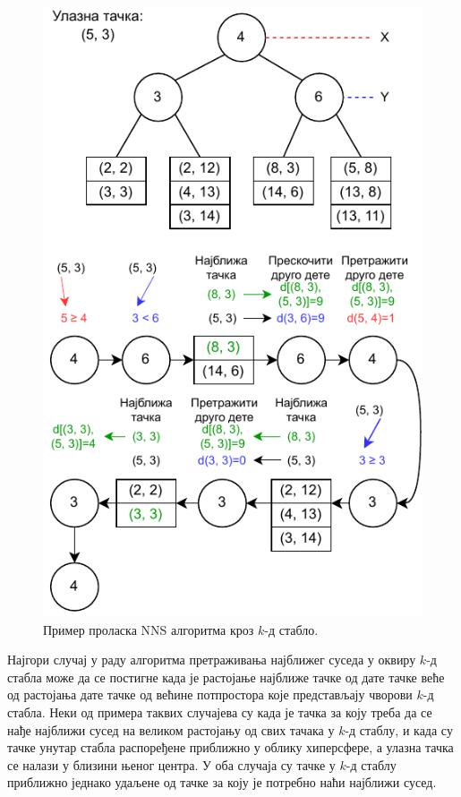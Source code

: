 \documentclass[master]{finthesis}
\newcommand*{\kd}{\texorpdfstring{$k$}{k}-д }
\begin{document}
\begin{figure}
    \centering
    \includegraphics[height=0.9\textheight]{slike/kd_traversal_sr.pdf}
    \caption{Пример проласка NNS алгоритма кроз \kd стабло.}
    \label{fig:kd-traversal}
\end{figure}

Најгори случај у раду алгоритма претраживања најближег суседа у оквиру \kd стабла може да се постигне када је растојање најближе тачке од дате тачке веће од растојања дате тачке од већине потпростора које представљају чворови \kd стабла. Неки од примера таквих случајева су када је тачка за коју треба да се нађе најближи сусед на великом растојању од свих тачака у \kd стаблу, и када су тачке унутар стабла распоређене приближно у облику хиперсфере, а улазна тачка се налази у близини њеног центра. У оба случаја су тачке у \kd стаблу приближно једнако удаљене од тачке за коју је потребно наћи најближи сусед.
\end{document}
